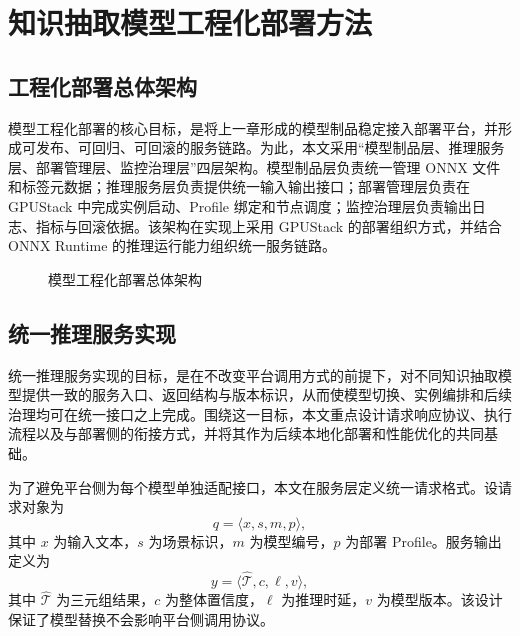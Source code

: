 \chapter{知识抽取模型工程化部署方法}

\section{工程化部署总体架构}
模型工程化部署的核心目标，是将上一章形成的模型制品稳定接入部署平台，并形成可发布、可回归、可回滚的服务链路。为此，本文采用“模型制品层、推理服务层、部署管理层、监控治理层”四层架构。模型制品层负责统一管理 ONNX 文件和标签元数据；推理服务层负责提供统一输入输出接口；部署管理层负责在 GPUStack 中完成实例启动、Profile 绑定和节点调度；监控治理层负责输出日志、指标与回滚依据。该架构在实现上采用 GPUStack 的部署组织方式，并结合 ONNX Runtime 的推理运行能力组织统一服务链路。

\begin{figure}[htbp]
  \centering
  \caption{模型工程化部署总体架构}
  \label{fig:deploy_arch_compact}
\end{figure}

\section{统一推理服务实现}
统一推理服务实现的目标，是在不改变平台调用方式的前提下，对不同知识抽取模型提供一致的服务入口、返回结构与版本标识，从而使模型切换、实例编排和后续治理均可在统一接口之上完成。围绕这一目标，本文重点设计请求响应协议、执行流程以及与部署侧的衔接方式，并将其作为后续本地化部署和性能优化的共同基础。

为了避免平台侧为每个模型单独适配接口，本文在服务层定义统一请求格式。设请求对象为
\begin{equation}
q=\langle x, s, m, p \rangle,
\label{eq:request_compact}
\end{equation}
其中 $x$ 为输入文本，$s$ 为场景标识，$m$ 为模型编号，$p$ 为部署 Profile。服务输出定义为
\begin{equation}
y=\langle \hat{\mathcal{T}}, c, \ell, v \rangle,
\label{eq:response_compact}
\end{equation}
其中 $\hat{\mathcal{T}}$ 为三元组结果，$c$ 为整体置信度，$\ell$ 为推理时延，$v$ 为模型版本。该设计保证了模型替换不会影响平台侧调用协议。

